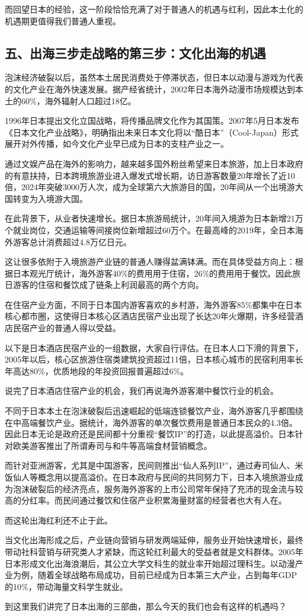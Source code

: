 而回望日本的经验，这一阶段恰恰充满了对于普通人的机遇与红利，因此本土化的机遇期更值得我们普通人重视。

\subsection{五、出海三步走战略的第三步：文化出海的机遇}

泡沫经济破裂以后，虽然本土居民消费处于停滞状态，但日本以动漫与游戏为代表的文化产业在海外快速发展。据产经省统计，2002年日本海外动漫市场规模达到本土的60\%，海外辐射人口超过18亿。

1996年日本提出文化立国战略，将传播品牌文化作为其国策。2007年5月日本发布《日本文化产业战略》，明确指出未来日本文化将以“酷日本”（Cool-Japan）形式展开对外传播，如今文化产业早已成为日本的支柱产业之一。

通过文娱产品在海外的影响力，越来越多国外粉丝希望来日本旅游，加上日本政府的有意扶持，日本跨境旅游业进入爆发式增长期，访日游客数量20年增长了近10倍，2024年突破3000万人次，成为全球第六大旅游目的国，20年间从一个出境游大国转变为入境游大国。

在此背景下，从业者快速增长。据日本旅游局统计，20年间入境游为日本新增21万个就业岗位，交通运输等间接岗位新增超过60万个。在最高峰的2019年，全日本海外游客总计消费超过4.8万亿日元。

这让很多依附于入境旅游产业链的普通人赚得盆满钵满。而在具体受益方向上：根据日本观光厅统计，海外游客40\%的费用用于住宿，26\%的费用用于餐饮。因此旅日游客的住宿和餐饮成了链条上利润最高的两个方向。

在住宿产业方面，不同于日本国内游客喜欢的乡村游，海外游客85\%都集中在日本核心都市圈，这使得日本核心区酒店民宿产业出现了长达20年火爆期，许多经营酒店民宿产业的普通人得以受益。

以下是日本酒店民宿产业的一组数据，大家自行评估。在日本人口下滑的背景下，2005年以后，核心区旅游住宿类建筑投资超过11倍，日本核心城市的民宿利用率长年高达80\%，优质地段的年投资回报普遍超过6\%。

说完了日本酒店住宿产业的机会，我们再说海外游客潮中餐饮行业的机会。

不同于日本本土在泡沫破裂后迅速崛起的低端连锁餐饮产业，海外游客几乎都围绕在中高端餐饮产业。据统计，海外游客的单次餐饮费用是普通日本民众的4.3倍。因此日本无论是政府还是民间都十分重视“餐饮IP”的打造，以此提高溢价。日本针对欧美游客推出了所谓寿司与和牛等高端食材营销概念。

而针对亚洲游客，尤其是中国游客，民间则推出“仙人系列IP”，通过寿司仙人、米饭仙人等概念用以提高溢价。在日本政府与民间的共同努力下，日本入境旅游业成为泡沫破裂后的经济亮点，服务海外游客的上市公司常年保持了充沛的现金流与较高的分红率。而民间通过餐饮和住宿产业积累海量财富的经营者也大有人在。

而这轮出海红利还不止于此。

当文化出海形成之后，产业链向营销与研发两端延伸，服务业开始快速增长，最终带动社科营销与研究类人才紧缺，而这轮红利最大的受益者就是文科群体。2005年日本形成文化出海浪潮后，其公立大学文科生的就业率开始超过理科生。以动漫产业为例，随着全球战略布局成功，目前已经成为日本第三大产业，占到每年GDP的10\%，带动海量文科学生就业。

到这里我们讲完了日本出海的三部曲，那么今天的我们也会有这样的机遇吗？
